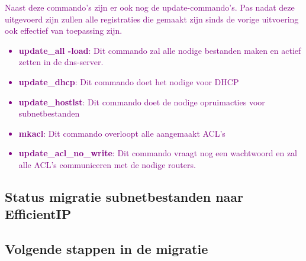 \textcolor{purple}{Naast deze commando's zijn er ook nog de update-commando's. Pas nadat deze uitgevoerd zijn zullen alle registraties die gemaakt zijn sinds de vorige uitvoering ook effectief van toepassing zijn.}
\textcolor{purple}{
\begin{itemize}
    \item \textbf{update\_all -load}: Dit commando zal alle nodige bestanden maken en actief zetten in de \acrshort{dns}-server.
    \item \textbf{update\_dhcp}: Dit commando doet het nodige voor DHCP
    \item \textbf{update\_hostlst}: Dit commando doet de nodige opruimacties voor subnetbestanden
    \item \textbf{mkacl}: Dit commando overloopt alle aangemaakt ACL's
    \item \textbf{update\_acl\_no\_write}: Dit commando vraagt nog een wachtwoord en zal alle ACL's communiceren met de nodige routers.
\end{itemize}
}

\subsection{Status migratie subnetbestanden naar EfficientIP}
\lipsum[0-1]
\subsection{Volgende stappen in de migratie}
\lipsum[2-3]


